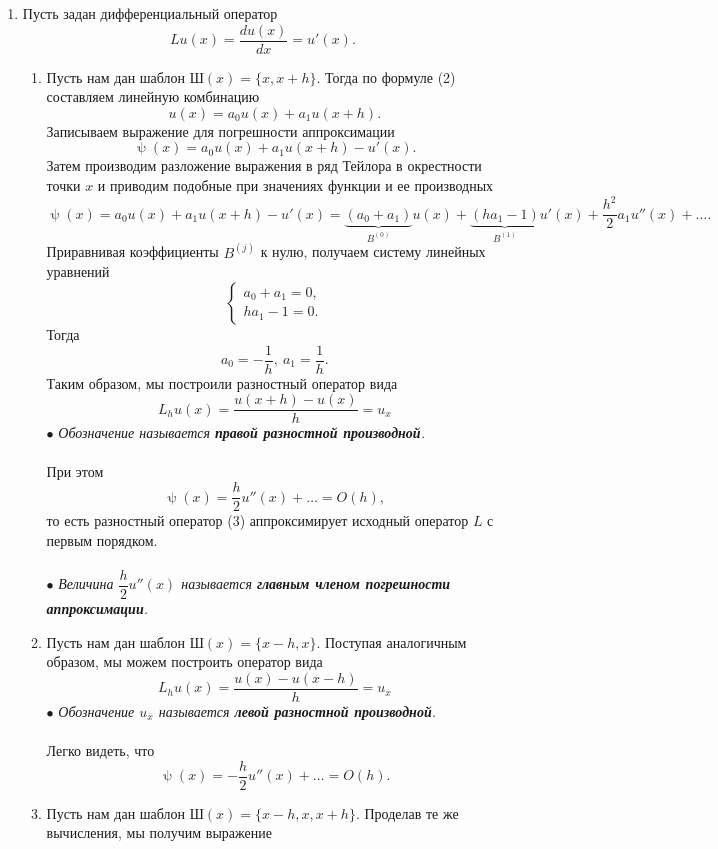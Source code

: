 \documentclass[a4paper, 12pt]{report}
\numberwithin{equation}{section}
\newcommand{\ol}{\overline}
\renewcommand{\psi}{\uppsi}
\begin{document}
	\begin{enumerate}
		\item Пусть задан дифференциальный оператор $$Lu(x) = \dfrac{d u(x)}{dx} = u'(x).$$
		\begin{enumerate}
			\item Пусть нам дан шаблон $\text{Ш}(x) = \{x, x+h\}$. Тогда по формуле (2) составляем линейную комбинацию
			$$u(x) = a_0 u(x) + a_1u(x+h).$$
			Записываем выражение для погрешности аппроксимации
			$$\psi(x)= a_0u(x) + a_1u(x+h) - u'(x).$$
			Затем производим разложение выражения в ряд Тейлора в окрестности точки $x$ и приводим подобные при значениях функции и ее производных
			$$\psi(x)= a_0u(x) + a_1u(x+h) - u'(x) = \underbrace{(a_0+a_1)}_{B ^{(0)}}u(x) + \underbrace{(ha_1 - 1)}_{B^{(1)}} u'(x) + \dfrac{h^2}{2} a_1 u''(x) + \ldots.$$
			Приравнивая коэффициенты $B^{(j)}$ к нулю, получаем систему линейных уравнений 
			$$\begin{cases}
				a_0+a_1 = 0,\\
				ha_1 - 1= 0.
			\end{cases}$$
			Тогда $$a_0 = -\dfrac 1h,\ a_1 = \dfrac 1h.$$
			Таким образом, мы построили разностный оператор вида 
			\begin{equation}
				L_hu(x) = \dfrac{u(x+h) - u(x)}{h} = u_x
			\end{equation}
			$\bullet$ \textit{Обозначение называется \textbf{правой разностной производной}.}\\\\
			При этом $$\psi(x) = \dfrac h2 u''(x) + \ldots = O(h),$$ то есть разностный оператор (3) аппроксимирует исходный оператор $L$ с первым порядком.\\\\
			$\bullet$ \textit{Величина $\dfrac h 2 u''(x)$ называется \textbf{главным членом погрешности аппроксимации}.}
			\item Пусть нам дан шаблон $\text{Ш}(x) = \{x-h, x\}$. Поступая аналогичным образом, мы можем построить оператор вида 
			\begin{equation}
				L_hu(x) = \dfrac{u(x) - u(x-h)}{h} = u_{\ol x}
			\end{equation}
			$\bullet$ \textit{Обозначение $u_{\ol x}$ называется \textbf{левой разностной производной}. }
			\\\\
			Легко видеть, что $$\psi(x) = -\dfrac h2 u''(x) + \ldots = O(h).$$ 
			\item Пусть нам дан шаблон $\text{Ш}(x) = \{x-h, x, x+h\}$. Проделав те же вычисления, мы получим выражение 

\end{enumerate}
\end{enumerate}
\end{document}
